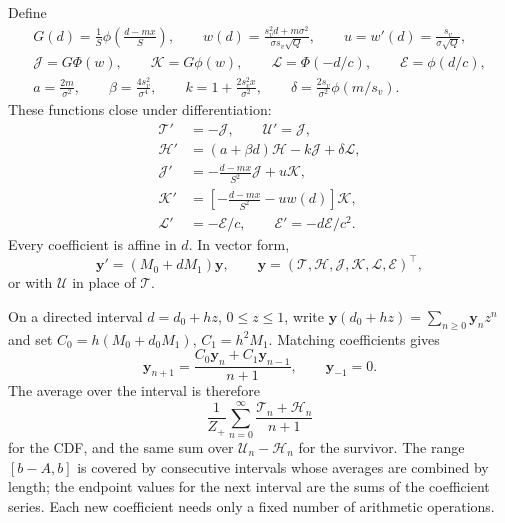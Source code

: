 \documentclass[12pt]{article}
\newcommand{\PhiN}{\Phi}
\newcommand{\phiN}{\phi}
\begin{document}
Define
\begin{gather}
 G(d)=\frac{1}{S}\phiN\!\left(\frac{d-mx}{S}\right),\qquad
 w(d)=\frac{s_v^2d+m\sigma^2}{\sigma s_v\sqrt Q},\qquad
 u=w'(d)=\frac{s_v}{\sigma\sqrt Q},\\
 \mathcal J=G\PhiN(w),\qquad \mathcal K=G\phiN(w),\qquad
 \mathcal L=\PhiN(-d/c),\qquad \mathcal E=\phiN(d/c),\\
 a=\frac{2m}{\sigma^2},\qquad \beta=\frac{4s_v^2}{\sigma^4},\qquad
 k=1+\frac{2s_v^2x}{\sigma^2},\qquad
 \delta=\frac{2s_v}{\sigma^2}\phiN(m/s_v).
\end{gather}
These functions close under differentiation:
\begin{align}
 \mathcal T'&=-\mathcal J,\qquad \mathcal U'=\mathcal J,\\
 \mathcal H'&=(a+\beta d)\mathcal H-k\mathcal J+\delta\mathcal L,
       \label{eq:joint-image-ode}\\
 \mathcal J'&=-\frac{d-mx}{S^2}\mathcal J+u\mathcal K,\\
 \mathcal K'&=\left[-\frac{d-mx}{S^2}-uw(d)\right]\mathcal K,\\
 \mathcal L'&=-\mathcal E/c,\qquad
 \mathcal E'=-d\mathcal E/c^2.
 \label{eq:joint-ode-closure}
\end{align}
Every coefficient is affine in $d$. In vector form,
\[
 \bm y'=(M_0+dM_1)\bm y,\qquad
 \bm y=(\mathcal T,\mathcal H,\mathcal J,\mathcal K,\mathcal L,\mathcal E)^\top,
\]
or with $\mathcal U$ in place of $\mathcal T$.

On a directed interval $d=d_0+h z$, $0\le z\le1$, write $\bm y(d_0+hz)=\sum_{n\ge0}\bm y_nz^n$ and set $C_0=h(M_0+d_0M_1)$, $C_1=h^2M_1$. Matching coefficients gives
\begin{equation}
 \boxed{\quad
 \bm y_{n+1}=\frac{C_0\bm y_n+C_1\bm y_{n-1}}{n+1},
 \qquad \bm y_{-1}=0.\quad}
 \label{eq:joint-series-recurrence}
\end{equation}
The average over the interval is therefore
\begin{equation}
 \boxed{\quad \frac{1}{Z_+}\sum_{n=0}^{\infty}
       \frac{\mathcal T_n+\mathcal H_n}{n+1}\quad}
 \label{eq:joint-series-integral}
\end{equation}
for the CDF, and the same sum over $\mathcal U_n-\mathcal H_n$ for the survivor. The range $[b-A,b]$ is covered by consecutive intervals whose averages are combined by length; the endpoint values for the next interval are the sums of the coefficient series. Each new coefficient needs only a fixed number of arithmetic operations.
\end{document}
